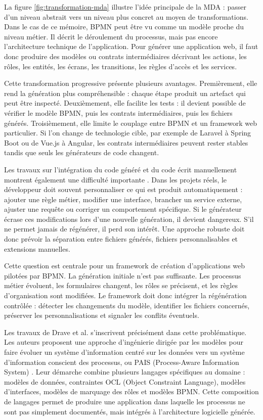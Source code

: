 La figure \ref{fig:transformation-mda} illustre l'idée principale de la MDA : passer d'un niveau
abstrait vers un niveau plus concret au moyen de transformations. Dans
le cas de ce mémoire, BPMN peut être vu comme un modèle proche du niveau
métier. Il décrit le déroulement du processus, mais pas encore
l'architecture technique de l'application. Pour générer une application
web, il faut donc produire des modèles ou contrats intermédiaires
décrivant les actions, les rôles, les entités, les écrans, les
transitions, les règles d'accès et les services.

Cette transformation progressive présente plusieurs avantages.
Premièrement, elle rend la génération plus compréhensible : chaque étape
produit un artefact qui peut être inspecté. Deuxièmement, elle facilite
les tests : il devient possible de vérifier le modèle BPMN, puis les
contrats intermédiaires, puis les fichiers générés. Troisièmement, elle
limite le couplage entre BPMN et un framework web particulier. Si l'on
change de technologie cible, par exemple de Laravel à Spring Boot ou de
Vue.js à Angular, les contrats intermédiaires peuvent rester stables
tandis que seuls les générateurs de code changent.

Les travaux sur l'intégration du code généré et du code écrit
manuellement montrent également une difficulté importante
\cite{greifenberg2015,rahad2021}. Dans les
projets réels, le développeur doit souvent personnaliser ce qui est
produit automatiquement : ajouter une règle métier, modifier une
interface, brancher un service externe, ajuster une requête ou corriger
un comportement spécifique. Si le générateur écrase ces modifications
lors d'une nouvelle génération, il devient dangereux. S'il ne permet
jamais de régénérer, il perd son intérêt. Une approche robuste doit donc
prévoir la séparation entre fichiers générés, fichiers personnalisables
et extensions manuelles.

Cette question est centrale pour un framework de création d'applications
web pilotées par BPMN. La génération initiale n'est pas suffisante. Les
processus métier évoluent, les formulaires changent, les rôles se
précisent, et les règles d'organisation sont modifiées. Le framework
doit donc intégrer la régénération contrôlée : détecter les changements
du modèle, identifier les fichiers concernés, préserver les
personnalisations et signaler les conflits éventuels.

Les travaux de Drave et al. s'inscrivent précisément dans cette
problématique. Les auteurs proposent une approche d'ingénierie dirigée
par les modèles pour faire évoluer un système d'information centré sur
les données vers un système d'information conscient des processus, ou
PAIS (Process-Aware Information System) \cite{drave2022}. Leur démarche combine
plusieurs langages spécifiques au domaine : modèles de données,
contraintes OCL (Object Constraint Language), modèles d'interfaces,
modèles de marquage des rôles et modèles BPMN. Cette composition de
langages permet de produire une application dans laquelle les processus
ne sont pas simplement documentés, mais intégrés à l'architecture
logicielle générée.

